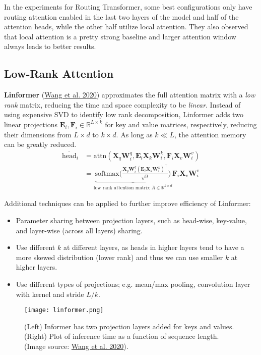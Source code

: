 \documentclass[12pt]{article}
\begin{document}
In the experiments for Routing Transformer, some best configurations only have routing attention enabled in the last two layers of the model and half of the attention heads, while the other half utilize local attention. They also observed that local attention is a pretty strong baseline and larger attention window always leads to better results.

\subsection{Low-Rank Attention}

\textbf{Linformer} (\href{https://arxiv.org/abs/2006.04768}{Wang et al. 2020}) approximates the full attention matrix with a \emph{low rank} matrix, reducing the time and space complexity to be \emph{linear}. Instead of using expensive SVD to identify low rank decomposition, Linformer adds two linear projections $\mathbf{E}_i, \mathbf{F}_i \in \mathbb{R}^{L \times k}$ for key and value matrices, respectively, reducing their dimensions from $L \times d$ to $k \times d$. As long as $k \ll L$, the attention memory can be greatly reduced.
\[
\begin{aligned}
\overline{\text{head}}_i 
&= \text{attn}(\mathbf{X}_q\mathbf{W}^q_i, \mathbf{E}_i\mathbf{X}_k\mathbf{W}^k_i, \mathbf{F}_i\mathbf{X}_v\mathbf{W}^v_i) \\
&= \underbrace{\text{softmax}\Big( \frac{\mathbf{X}_q\mathbf{W}^q_i (\mathbf{E}_i \mathbf{X}_k\mathbf{W}^k_i)^\top}{\sqrt{d}} \Big)}_{\text{low rank attention matrix }\bar{A} \in \mathbb{R}^{k \times d}} \mathbf{F}_i \mathbf{X}_v\mathbf{W}^v_i
\end{aligned}
\]

Additional techniques can be applied to further improve efficiency of Linformer:
\begin{itemize}
    \item Parameter sharing between projection layers, such as head-wise, key-value, and layer-wise (across all layers) sharing.
    \item Use different $k$ at different layers, as heads in higher layers tend to have a more skewed distribution (lower rank) and thus we can use smaller $k$ at higher layers.
    \item Use different types of projections; e.g. mean/max pooling, convolution layer with kernel and stride $L/k$.
\end{itemize}

\begin{figure}[h!]
    \centering
    \texttt{[image: linformer.png]}
    \caption{(Left) Informer has two projection layers added for keys and values. (Right) Plot of inference time as a function of sequence length. (Image source: \href{https://arxiv.org/abs/2006.04768}{Wang et al. 2020}).}
\end{figure}
\end{document}
